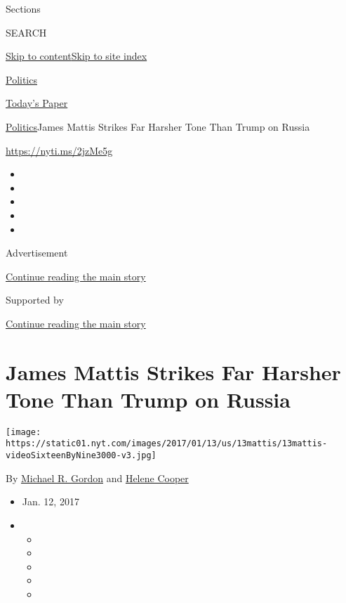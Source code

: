 Sections

SEARCH

\protect\hyperlink{site-content}{Skip to
content}\protect\hyperlink{site-index}{Skip to site index}

\href{https://www.nytimes.com/section/politics}{Politics}

\href{https://myaccount.nytimes.com/auth/login?response_type=cookie\&client_id=vi}{}

\href{https://www.nytimes.com/section/todayspaper}{Today's Paper}

\href{/section/politics}{Politics}\textbar{}James Mattis Strikes Far
Harsher Tone Than Trump on Russia

\url{https://nyti.ms/2jzMe5g}

\begin{itemize}
\item
\item
\item
\item
\item
\end{itemize}

Advertisement

\protect\hyperlink{after-top}{Continue reading the main story}

Supported by

\protect\hyperlink{after-sponsor}{Continue reading the main story}

\hypertarget{james-mattis-strikes-far-harsher-tone-than-trump-on-russia}{%
\section{James Mattis Strikes Far Harsher Tone Than Trump on
Russia}\label{james-mattis-strikes-far-harsher-tone-than-trump-on-russia}}

\texttt{[image: https://static01.nyt.com/images/2017/01/13/us/13mattis/13mattis-videoSixteenByNine3000-v3.jpg]}

By \href{http://www.nytimes.com/by/michael-r-gordon}{Michael R. Gordon}
and \href{http://www.nytimes.com/by/helene-cooper}{Helene Cooper}

\begin{itemize}
\item
  Jan. 12, 2017
\item
  \begin{itemize}
  \item
  \item
  \item
  \item
  \item
  \end{itemize}
\end{itemize}

